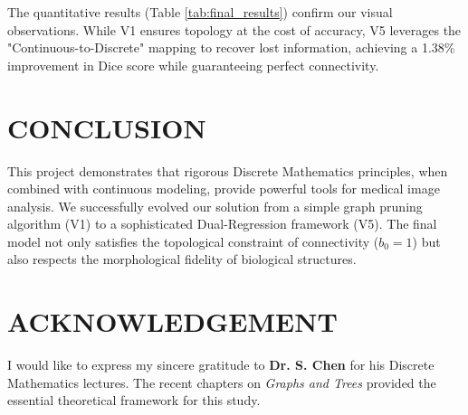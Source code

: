 \documentclass[twocolumn, 10pt, a4paper]{article}
\begin{document}
\begin{table}[h]
    \centering
    \caption{Quantitative Comparison. V5 is the only method that improves both Topology and Dice.}
    \label{tab:final_results}
\end{table}

The quantitative results (Table \ref{tab:final_results}) confirm our visual observations. While V1 ensures topology at the cost of accuracy, V5 leverages the "Continuous-to-Discrete" mapping to recover lost information, achieving a 1.38\% improvement in Dice score while guaranteeing perfect connectivity.

\section{CONCLUSION}
This project demonstrates that rigorous Discrete Mathematics principles, when combined with continuous modeling, provide powerful tools for medical image analysis. We successfully evolved our solution from a simple graph pruning algorithm (V1) to a sophisticated Dual-Regression framework (V5). The final model not only satisfies the topological constraint of connectivity ($b_0=1$) but also respects the morphological fidelity of biological structures.

\section{ACKNOWLEDGEMENT}
I would like to express my sincere gratitude to \textbf{Dr. S. Chen} for his Discrete Mathematics lectures. The recent chapters on \textit{Graphs and Trees} provided the essential theoretical framework for this study.
\end{document}
